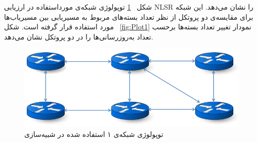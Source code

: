 شکل ~\ref{fig:Net1} توپولوژی شبکه‌ی مورداستفاده در ارزیابی NLSR را نشان می‌دهد. این شبکه برای مقایسه‌ی دو پروتکل از نظر تعداد بسته‌های مربوط به مسیریابی بین مسیریاب‌ها مورد استفاده قرار گرفته است. شکل ~\ref{fig:Plot1} نمودار تغییر تعداد بسته‌ها برحسب تعداد به‌روزرسانی‌ها را در دو پروتکل نشان می‌دهد. \begin{figure}[h!]
\centering
\includegraphics[scale=0.7]{./resources/figures/Network1.png}
\caption{توپولوژی شبکه‌ی ۱ استفاده شده در شبیه‌سازی}
\label{fig:Net1}
\end{figure}
